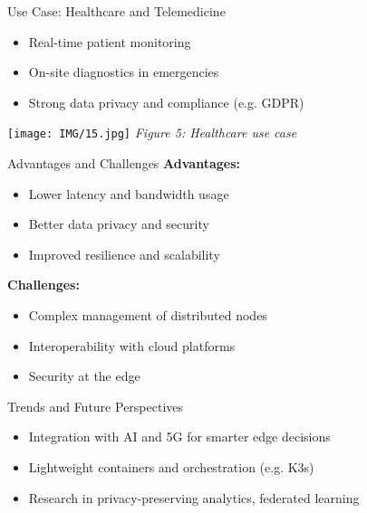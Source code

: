 \documentclass{beamer}
\begin{document}
\begin{frame}{Use Case: Healthcare and Telemedicine}
  \begin{itemize}
    \item Real-time patient monitoring
    \item On-site diagnostics in emergencies
    \item Strong data privacy and compliance (e.g. GDPR)
  \end{itemize}
  \vspace{0.5cm}
  \centering
  \texttt{[image: IMG/15.jpg]} %
  \vspace{0.2cm}
  \small \textit{Figure 5: Healthcare use case}
\end{frame}

\begin{frame}{Advantages and Challenges}
  \textbf{Advantages:}
  \begin{itemize}
    \item Lower latency and bandwidth usage
    \item Better data privacy and security
    \item Improved resilience and scalability
  \end{itemize}
  \vspace{0.3cm}
  \textbf{Challenges:}
  \begin{itemize}
    \item Complex management of distributed nodes
    \item Interoperability with cloud platforms
    \item Security at the edge
  \end{itemize}
\end{frame}

\begin{frame}{Trends and Future Perspectives}
  \begin{itemize}
    \item Integration with AI and 5G for smarter edge decisions
    \item Lightweight containers and orchestration (e.g. K3s)
    \item Research in privacy-preserving analytics, federated learning
  \end{itemize}
\end{frame}
\end{document}
